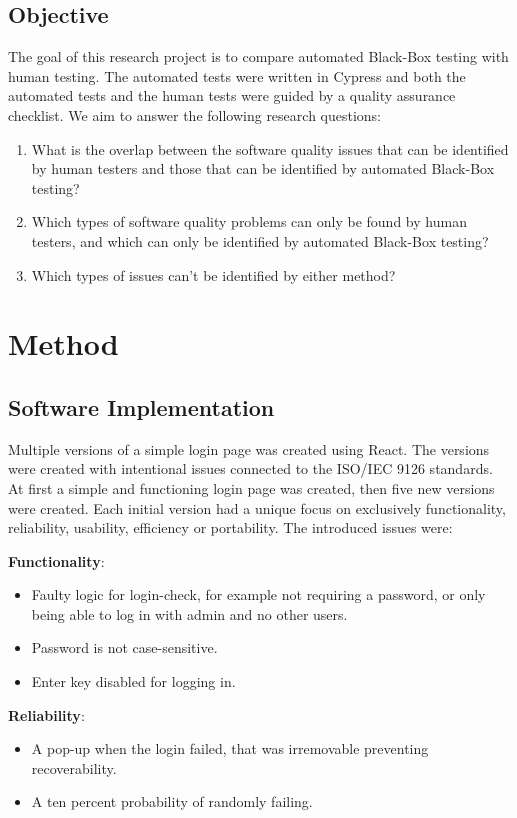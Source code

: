 \documentclass[journal,twocolumn]{IEEEtran}
\begin{document}
\subsection{Objective}
The goal of this research project is to compare automated Black-Box testing with human testing. The automated tests were written in Cypress and both the automated tests and the human tests were guided by a quality assurance checklist. We aim to answer the following research questions:
\begin{enumerate}
    \item What is the overlap between the software quality issues that can be identified by human testers and those that can be identified by automated Black-Box testing? %
    \item Which types of software quality problems can only be found by human testers, and which can only be identified by automated Black-Box testing? %
    \item Which types of issues can't be identified by either method? %
\end{enumerate}

\section{Method}
\subsection{Software Implementation}
Multiple versions of a simple login page was created using React. The versions were created with intentional issues connected to the ISO/IEC 9126 standards. At first a simple and functioning login page was created, then five new versions were created. Each initial version had a unique focus on exclusively functionality, reliability, usability, efficiency or portability. The introduced issues were:

\textbf{Functionality}:
\begin{itemize}
    \item Faulty logic for login-check, for example not requiring a password, or only being able to log in with admin and no other users.
    \item Password is not case-sensitive.
    \item Enter key disabled for logging in.
\end{itemize}

\textbf{Reliability}:
\begin{itemize}
    \item A pop-up when the login failed, that was irremovable preventing recoverability.
    \item A ten percent probability of randomly failing.
\end{itemize}
\end{document}
